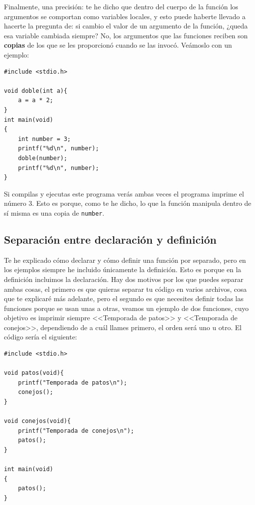\documentclass[a4paper]{article}
\begin{document}
Finalmente, una precisión: te he dicho que dentro del cuerpo de la función
los argumentos se comportan como variables locales, y esto puede haberte
llevado a hacerte la pregunta de: si cambio el valor de un argumento de la
función, ¿queda esa variable cambiada siempre? No, los argumentos que las
funciones reciben son \textbf{copias} de los que se les proporcionó cuando se
las invocó. Veámoslo con un ejemplo:


\noindent
\begin{minipage}[H]{\linewidth}
\mbox{}
\begin{lstlisting}[style=C, label={lst:functionByValue},
caption={Demostración de que una función recibe copias de sus argumentos}]
#include <stdio.h>

void doble(int a){
    a = a * 2;
}
int main(void)
{
    int number = 3;
    printf("%d\n", number);
    doble(number);
    printf("%d\n", number);
}
\end{lstlisting}
\end{minipage}

Si compilas y ejecutas este programa verás ambas veces el programa imprime el
número 3. Esto es porque, como te he dicho, lo que la función manipula dentro
de sí misma es una copia de \texttt{number}.

\subsection{Separación entre declaración y definición}
Te he explicado cómo declarar y cómo definir una función por separado, pero
en los ejemplos siempre he incluido únicamente la definición. Esto es porque en
la definición incluimos la declaración. Hay dos motivos por los que puedes
separar ambas cosas, el primero es que quieras separar tu código en varios
archivos, cosa que te explicaré más adelante, pero el segundo es que necesites
definir todas las funciones porque se usan unas a otras, veamos un ejemplo
de dos funciones, cuyo objetivo es imprimir siempre <<Temporada de patos>> y
<<Temporada de conejos>>, dependiendo de a cuál llames primero, el orden será
uno u otro. El código sería el siguiente:


\noindent
\begin{minipage}[H]{\linewidth}
\mbox{}
\begin{lstlisting}[style=C, label={lst:cyclicFunctions},
caption={Declaración separa de definición}]
#include <stdio.h>

void patos(void){
    printf("Temporada de patos\n");
    conejos();
}

void conejos(void){
    printf("Temporada de conejos\n");
    patos();
}

int main(void)
{
    patos();
}
\end{lstlisting}
\end{minipage}
\end{document}
